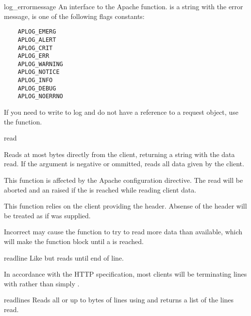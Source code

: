 \begin{methoddesc}{log_error}{message}
  An interface to the Apache 
  function.  is a string with the error message,
   is one of the following flags constants:

  \begin{verbatim}
    APLOG_EMERG
    APLOG_ALERT
    APLOG_CRIT
    APLOG_ERR
    APLOG_WARNING
    APLOG_NOTICE
    APLOG_INFO
    APLOG_DEBUG
    APLOG_NOERRNO
  \end{verbatim}            

  If you need to write to log and do not have a reference to a request object,
  use the  function.
\end{methoddesc}

\begin{methoddesc}[request]{read}{}

  Reads at most  bytes directly from the client, returning a
  string with the data read. If the  argument is negative or
  ommitted, reads all data given by the client.

  This function is affected by the  Apache configuration
  directive. The read will be aborted and an 
  raised if the  is reached while reading client data.

  This function relies on the client providing the 
  header. Absense of the  header will be treated as
  if  was supplied.

  Incorrect  may cause the function to try to read
  more data than available, which will make the function block until a
   is reached.

\end{methoddesc}

\begin{methoddesc}[request]{readline}{}
  Like  but reads until end of line. 
  
  \begin{notice}
    In accordance with the HTTP specification, most clients will
    be terminating lines with  rather
    than simply .
  \end{notice}

\end{methoddesc}

\begin{methoddesc}[request]{readlines}{}
  Reads all or up to  bytes of lines using
   and returns a list of the lines read.
\end{methoddesc}


